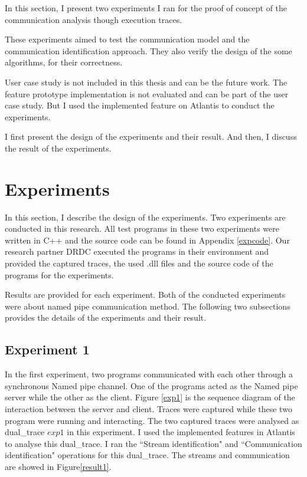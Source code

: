 


\label{chapter:Exp}
In this section, I present two experiments I ran for the proof of concept of the communication analysis though execution traces.

These experiments aimed to test the communication model and the communication identification approach. They also verify the design of the some algorithms, for their correctness.  

User case study is not included in this thesis and can be the future work. The feature prototype implementation is not evaluated and can be part of the user case study. But I used the implemented feature on Atlantis to conduct the experiments.

I first present the design of the experiments and their result. And then, I discuss the result of the experiments.  

\section{Experiments}
In this section, I describe the design of the experiments. Two experiments are conducted in this research. All test programs in these two experiments were written in C++ and the source code can be found in Appendix \ref{expcode}. Our research partner DRDC executed the programs in their environment and provided the captured traces, the used .dll files and the source code of the programs for the experiments.

Results are provided for each experiment. Both of the conducted experiments were about named pipe communication method. The following two subsections provides the details of the experiments and their result.

\subsection{Experiment 1}
In the first experiment, two programs communicated with each other through a synchronous Named pipe channel. One of the programs acted as the Named pipe server while the other as the client. Figure \ref{exp1} is the sequence diagram of the interaction between the server and client. Traces were captured while these two program were running and interacting. The two captured traces were analysed as dual\_trace $exp1$ in this experiment. I used the implemented features in Atlantis to analyse this dual\_trace. I ran the ``Stream identification" and ``Communication identification" operations for this dual\_trace. The streams and communication are showed in Figure\ref{result1}.

